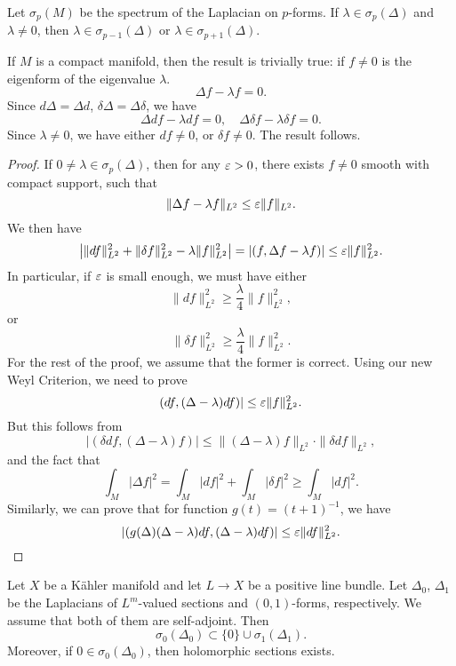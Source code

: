 \begin{theorem}[Charalambous-Lu]
Let $\sigma_p(M)$ be the spectrum of the Laplacian on $p$-forms. If $\lambda\in\sigma_p(\Delta)$ and $\lambda\neq 0$, then $\lambda\in\sigma_{p-1}(\Delta)$ or $\lambda \in\sigma_{p+1}(\Delta)$.
\end{theorem}

\begin{remark} If $M$ is a compact manifold, then the result is trivially true: if $f\neq 0$ is the eigenform  of the eigenvalue $\lambda$.
\[
\Delta f-\lambda f=0.
\]
Since $d\Delta=\Delta d$, $\delta\Delta=\Delta\delta$, we have
\[
\Delta df-\lambda df=0, \quad \Delta\delta f-\lambda \delta f=0.
\]
Since $\lambda\neq 0$, we have either $df\neq 0$, or $\delta f\neq 0$. The result follows. 
\end{remark}

\begin{proof}
If $0\neq\lambda\in\sigma_p(\Delta)$, then for any $\varepsilon>0$, there exists $f\neq 0$ smooth with compact support, such that 
\[
\|\Delta f-\lambda f\|_{L^2}\leq\varepsilon\|f\|_{L^2}.
\]
We then have 
\[
\left|\|df\|^2_{L^2}+\|\delta f\|^2_{L^2}-\lambda\|f\|^2_{L^2}\right|=|(f,\Delta f-\lambda f)|\leq\varepsilon \|f\|_{L^2}^2.
\]
In particular, if $\varepsilon$ is small enough, we must have either 
\[
\|df\|^2_{L^2}\geq\frac\lambda 4\|f\|^2_{L^2},
\]
or
\[
\|\delta f\|^2_{L^2}\geq\frac\lambda 4\|f\|^2_{L^2}.
\]
For the rest of the proof, we assume that the former is correct. Using our new Weyl Criterion, we need to prove 
\[
(df, (\Delta-\lambda) df)|\leq\varepsilon\|f\|^2_{L^2}.
\]
But this follows from 
\[
|(\delta df, (\Delta-\lambda)f)|\leq\|(\Delta-\lambda)f\|_{L^2}\cdot\|\delta df\|_{L^2},
\]
and the fact that 
\[
\int_M|\Delta f|^2=\int_M |df|^2+\int_M|\delta f|^2\geq \int_M | df|^2.
\]
Similarly, we can prove that for function $g(t)=(t+1)^{-1}$, we have
\[
|(g(\Delta)(\Delta-\lambda) df, (\Delta-\lambda) df)|\leq\varepsilon\|df\|^2_{L^2}.
\]


\end{proof}

\begin{corollary}
Let $X$ be a K\"ahler manifold and let $L\to X$ be a positive line bundle. Let $\Delta_0$, $\Delta_1$ be the Laplacians  of $L^m$-valued sections and $(0,1)$-forms, respectively. We assume that both of them are self-adjoint. Then 
\[
\sigma_0(\Delta_0)\subset \{0\}\cup\sigma_1(\Delta_1).
\]
Moreover, if $0\in\sigma_0(\Delta_0)$, then holomorphic sections exists. 
\end{corollary}



